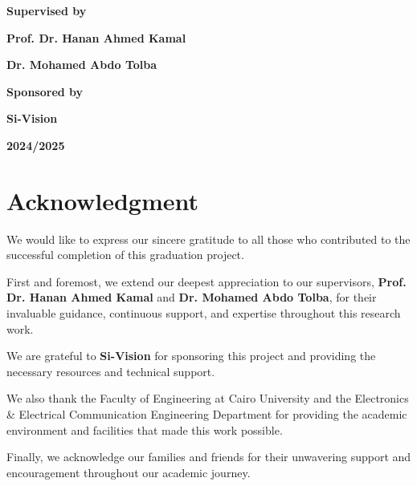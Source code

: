 \documentclass[a4paper,12pt]{report}
\newcommand{\supervisor}{Prof. Dr. Hanan Ahmed Kamal}
\newcommand{\supervisortwo}{Dr. Mohamed Abdo Tolba}
\newcommand{\sponsor}{Si-Vision}
\newcommand{\academicyear}{2024/2025}
\begin{document}
\begin{titlepage}
\begin{center}
\vspace{1cm}

{\Large \textbf{Supervised by}}

\vspace{0.5cm}

{\large \textbf{\supervisor}}

\vspace{0.3cm}

{\large \textbf{\supervisortwo}}

\vspace{1cm}

{\Large \textbf{Sponsored by}}

\vspace{0.5cm}

{\large \textbf{\sponsor}}

\vfill

{\Large \textbf{\academicyear}}

\vspace{1cm}

\end{center}

\end{titlepage}


\chapter*{Acknowledgment}

We would like to express our sincere gratitude to all those who contributed to the successful completion of this graduation project.

First and foremost, we extend our deepest appreciation to our supervisors, \textbf{\supervisor} and \textbf{\supervisortwo}, for their invaluable guidance, continuous support, and expertise throughout this research work.

We are grateful to \textbf{\sponsor} for sponsoring this project and providing the necessary resources and technical support.

We also thank the Faculty of Engineering at Cairo University and the Electronics \& Electrical Communication Engineering Department for providing the academic environment and facilities that made this work possible.

Finally, we acknowledge our families and friends for their unwavering support and encouragement throughout our academic journey.
\end{document}
